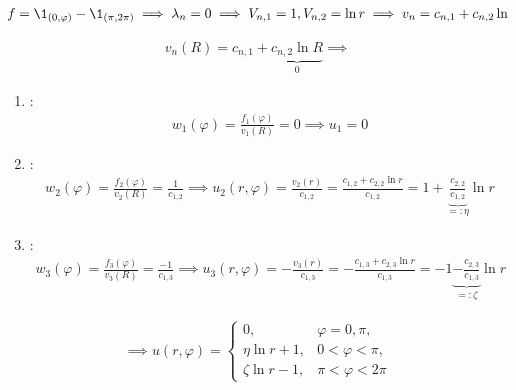 \begin{solution}
\begin{enumerate}[label = (\roman*)]
    \begin{align*}
        f = \1_{(0, \varphi)} - \1_{(\pi, 2 \pi)}
        \implies
        \lambda_n = 0
        \implies
        V_{n, 1} = 1, V_{n, 2} = \ln{r}
        \implies
        v_n = c_{n, 1} + c_{n, 2} \ln
    \end{align*}

    \begin{align*}
        v_n(R)
        =
        c_{n, 1} + \underbrace{c_{n, 2} \ln{R}}_0
        \implies
    \end{align*}

    \begin{enumerate}

        \item {}:
        \begin{align*}
            w_1(\varphi)
            =
            \frac{f_1(\varphi)}{v_1(R)} = 0
            \implies
            u_1 = 0
        \end{align*}

        \item {}:
        \begin{align*}
            w_2(\varphi)
            =
            \frac{f_2(\varphi)}{v_2(R)}
            =
            \frac{1}{c_{1, 2}}
            \implies
            u_2(r, \varphi)
            =
            \frac{v_2(r)}{c_{1, 2}}
            =
            \frac{c_{1, 2} + c_{2, 2} \ln{r}}{c_{1, 2}}
            =
            1 + \underbrace{\frac{c_{2, 2}}{c_{1, 2}}}_{=: \eta} \ln{r}
        \end{align*}

        \item \Quote{$\pi < \varphi < 2 \pi$}:
        \begin{align*}
            w_3(\varphi)
            =
            \frac{f_3(\varphi)}{v_3(R)}
            =
            \frac{-1}{c_{1, 3}}
            \implies
            u_3(r, \varphi)
            =
            -\frac{v_3(r)}{c_{1, 3}}
            =
            -\frac{c_{1, 3} + c_{2, 3} \ln{r}}{c_{1, 3}}
            =
            -1 \underbrace{-\frac{c_{2, 3}}{c_{1, 3}}}_{=: \zeta} \ln{r}
        \end{align*}

    \end{enumerate}

    \begin{align*}
        \implies
        u(r, \varphi)
        =
        \begin{cases}
            0,                & \varphi = 0, \pi, \\
            \eta  \ln{r} + 1, & 0 < \varphi < \pi, \\
            \zeta \ln{r} - 1, & \pi < \varphi < 2 \pi
        \end{cases}
    \end{align*}

\end{enumerate}

\end{solution}

